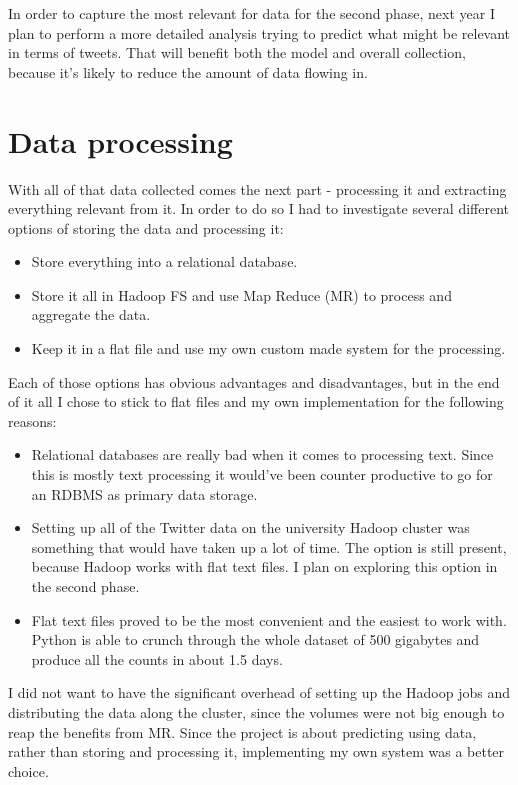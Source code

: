 \documentclass[minf,twoside,singlespacing,parskip,frontabs,notimes,11pt]{infthesis}
\begin{document}
In order to capture the most relevant for data for the second phase, next year I plan to perform a more detailed analysis trying to predict what might be relevant in terms of tweets. That will benefit both the model and overall collection, because it's likely to reduce the amount of data flowing in. 


\section{Data processing}
\label{sec:dp}


With all of that data collected comes the next part - processing it and extracting everything relevant from it. In order to do so I had to investigate several different options of storing the data and processing it:
\begin{itemize}
\item Store everything into a relational database.
\item Store it all in Hadoop FS and use Map Reduce (MR) to process and aggregate the data. 
\item Keep it in a flat file and use my own custom made system for the processing. 
\end{itemize}


Each of those options has obvious advantages and disadvantages, but in the end of it all I chose to stick to flat files and my own implementation for the following reasons:
\begin{itemize}
\item Relational databases are really bad when it comes to processing text. Since this is mostly text processing it would've been counter productive to go for an RDBMS as primary data storage.
\item Setting up all of the Twitter data on the university Hadoop cluster was something that would have taken up a lot of time. The option is still present, because Hadoop works with flat text files. I plan on exploring this option in the second phase.
\item Flat text files proved to be the most convenient and the easiest to work with. Python is able to crunch through the whole dataset of 500 gigabytes and produce all the counts in about 1.5 days. 
\end{itemize}


I did not want to have the significant overhead of setting up the Hadoop jobs and distributing the data along the cluster, since the volumes were not big enough to reap the benefits from MR. Since the project is about predicting using data, rather than storing and processing it, implementing my own system was a better choice. 
\end{document}
